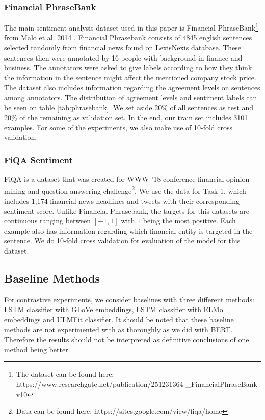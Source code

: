 \documentclass[../main.tex]{subfiles}
\begin{document}
\subsubsection{Financial PhraseBank}
The main sentiment analysis dataset used in this paper is Financial PhraseBank\footnote{The dataset can be found here: https://www.researchgate.net/publication/251231364 \_FinancialPhraseBank-v10} from Malo et al. 2014 \cite{Malo2014}. Financial Phrasebank consists of 4845 english sentences selected randomly from financial news found on LexisNexis database. These sentences then were annotated by 16 people with background in finance and business. The annotators were asked to give labels according to how they think the information in the sentence might affect the mentioned company stock price. The dataset also includes information regarding the agreement levels on sentences among annotators. The distribution of agreement levels and sentiment labels can be seen on table \ref{tab:phrasebank}. We set aside 20\% of all sentences as test and 20\% of the remaining as validation set. In the end, our train set includes 3101 examples. For some of the experiments, we also make use of 10-fold cross validation.

    
    
\subsubsection{FiQA Sentiment}
FiQA \cite{Maia2018} is a dataset that was created for WWW '18 conference financial opinion mining and question answering challenge\footnote{Data can be found here: https://sites.google.com/view/fiqa/home}. We use the data for Task 1, which includes 1,174 financial news headlines and tweets with their corresponding sentiment score. Unlike Financial Phrasebank, the targets for this datasets are continuous ranging between $[-1,1]$ with $1$ being the most positive. Each example also has information regarding which financial entity is targeted in the sentence. We do 10-fold cross validation for evaluation of the model for this dataset.

\subsection{Baseline Methods} \label{baseline_methods}
For contrastive experiments, we consider baselines with three different methods: LSTM classifier with GLoVe embeddings, LSTM classifier with ELMo embeddings and ULMFit classifier. It should be noted that these baseline methods are not experimented with as thoroughly as we did with BERT. Therefore the results should not be interpreted as definitive conclusions of one method being better. 
\end{document}

